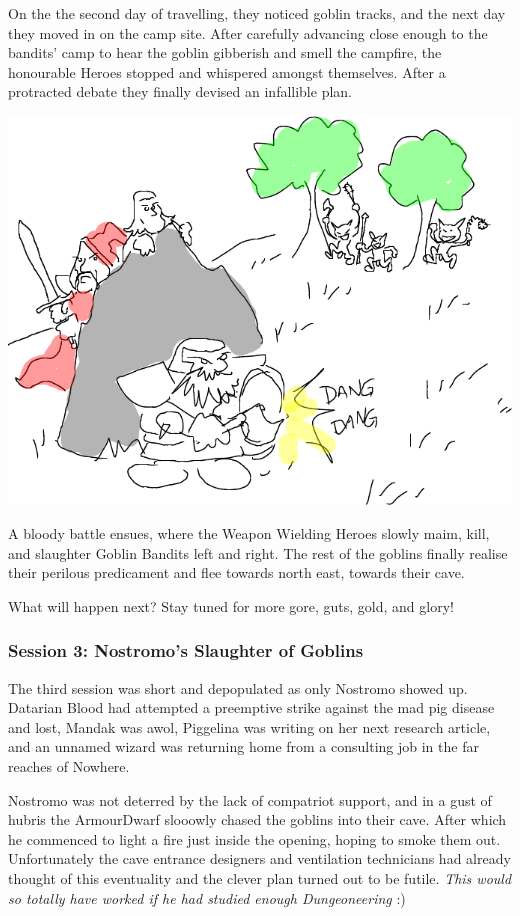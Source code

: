 On the the second day of travelling, they noticed goblin tracks, and the next day they moved in on the camp site. After carefully advancing close enough to the bandits' camp to hear the goblin gibberish and smell the campfire, the honourable Heroes stopped and whispered amongst themselves. After a protracted debate they finally devised an infallible plan.

\begin{center}
\vspace{0.5 cm}
\includegraphics[width=0.7\linewidth]{./figs/playthrough/sneaky-plan.png}
\vspace{0.5 cm}
\end{center}

A bloody battle ensues, where the Weapon Wielding Heroes slowly maim, kill, and slaughter Goblin Bandits left and right. The rest of the goblins finally realise their perilous predicament and flee towards north east, towards their cave.

What will happen next? Stay tuned for more gore, guts, gold, and glory!


\subsubsection*{Session 3: Nostromo's Slaughter of Goblins}
The third session was short and depopulated as only Nostromo showed up. Datarian Blood had attempted a preemptive strike against the mad pig disease and lost, Mandak was awol, Piggelina was writing on her next research article, and an unnamed wizard was returning home from a consulting job in the far reaches of Nowhere.

Nostromo was not deterred by the lack of compatriot support, and in a gust of hubris the ArmourDwarf slooowly chased the goblins into their cave. After which he commenced to light a fire just inside the opening, hoping to smoke them out. Unfortunately the cave entrance designers and ventilation technicians had already thought of this eventuality and the clever plan turned out to be futile. \emph{This would so totally have worked if he had studied enough Dungeoneering} :)

